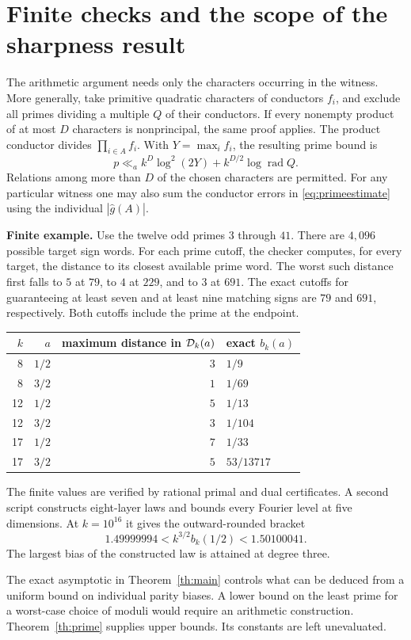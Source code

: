\documentclass[11pt,letterpaper]{article}
\theoremstyle{research}
\newcommand{\rad}{\operatorname{rad}}
\newcommand{\sect}[1]{\section{\texorpdfstring{\color{ink}#1}{#1}}}
\begin{document}
\clearpage
\sect{Finite checks and the scope of the sharpness result}
The arithmetic argument needs only the characters occurring in the witness.
More generally, take primitive quadratic characters of conductors $f_i$, and
exclude all primes dividing a multiple $Q$ of their conductors. If every
nonempty product of at most $D$ characters is nonprincipal, the same proof
applies. The product conductor divides $\prod_{i\in A}f_i$.
With $Y=\max_i f_i$, the resulting prime bound is
\[
 p\ll_a k^D\log^2(2Y)+k^{D/2}\log\rad Q.
\]
Relations among more than $D$ of the chosen characters are permitted.
For any particular witness one may also sum the conductor errors in
\eqref{eq:primeestimate} using the individual $|\widehat g(A)|$.

\textbf{Finite example.} Use the twelve odd primes $3$ through $41$.
There are $4{,}096$ possible target sign words. For each prime cutoff,
the checker computes, for every target, the distance to its closest
available prime word. The worst such distance first falls to $5$ at $79$,
to $4$ at $229$, and to $3$ at $691$. The exact cutoffs for guaranteeing
at least seven and at least nine matching signs are $79$ and $691$, respectively. Both cutoffs include the prime at the endpoint.

\begin{center}\small
\begin{tabular}{@{}rrr@{\qquad}l@{}}
\toprule
$k$ & $a$ & maximum distance in $\mathcal D_k(a)$ & exact $b_k(a)$\\
\midrule
8 & $1/2$ & $3$ & $1/9$\\
8 & $3/2$ & $1$ & $1/69$\\
12 & $1/2$ & $5$ & $1/13$\\
12 & $3/2$ & $3$ & $1/104$\\
17 & $1/2$ & $7$ & $1/33$\\
17 & $3/2$ & $5$ & $53/13717$\\
\bottomrule
\end{tabular}
\end{center}
The finite values are verified by rational primal and dual certificates.
A second script constructs eight-layer laws and bounds every Fourier
level at five dimensions. At $k=10^{16}$ it gives the outward-rounded bracket
\[
  1.49999994 < k^{3/2}b_k(1/2) < 1.50100041 .
\]
The largest bias of the constructed law is attained at degree three.

The exact asymptotic in Theorem~\ref{th:main} controls what can be deduced
from a uniform bound on individual parity biases. A lower bound on the
least prime for a worst-case choice of moduli would require an arithmetic
construction. Theorem~\ref{th:prime} supplies upper bounds. Its constants
are left unevaluated.
\end{document}
